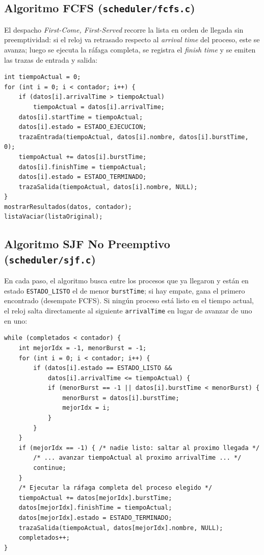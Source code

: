 \documentclass[12pt]{article}
\begin{document}
    \subsection{Algoritmo FCFS (\texttt{scheduler/fcfs.c})}
    El despacho \textit{First-Come, First-Served} recorre la lista en orden de llegada sin preemptividad: si el reloj va retrasado respecto al \textit{arrival time} del proceso, este se avanza; luego se ejecuta la ráfaga completa, se registra el \textit{finish time} y se emiten las trazas de entrada y salida:
    \begin{lstlisting}[caption={Nucleo del algoritmo FCFS no-preemptivo.}]
int tiempoActual = 0;
for (int i = 0; i < contador; i++) {
    if (datos[i].arrivalTime > tiempoActual)
        tiempoActual = datos[i].arrivalTime;
    datos[i].startTime = tiempoActual;
    datos[i].estado = ESTADO_EJECUCION;
    trazaEntrada(tiempoActual, datos[i].nombre, datos[i].burstTime, 0);
    tiempoActual += datos[i].burstTime;
    datos[i].finishTime = tiempoActual;
    datos[i].estado = ESTADO_TERMINADO;
    trazaSalida(tiempoActual, datos[i].nombre, NULL);
}
mostrarResultados(datos, contador);
listaVaciar(listaOriginal);
    \end{lstlisting}

    \subsection{Algoritmo SJF No Preemptivo (\texttt{scheduler/sjf.c})}
    En cada paso, el algoritmo busca entre los procesos que ya llegaron y están en estado \texttt{ESTADO\_LISTO} el de menor \texttt{burstTime}; si hay empate, gana el primero encontrado (desempate FCFS). Si ningún proceso está listo en el tiempo actual, el reloj salta directamente al siguiente \texttt{arrivalTime} en lugar de avanzar de uno en uno:
    \begin{lstlisting}[caption={Seleccion del proceso de menor ráfaga en SJF.}]
while (completados < contador) {
    int mejorIdx = -1, menorBurst = -1;
    for (int i = 0; i < contador; i++) {
        if (datos[i].estado == ESTADO_LISTO &&
            datos[i].arrivalTime <= tiempoActual) {
            if (menorBurst == -1 || datos[i].burstTime < menorBurst) {
                menorBurst = datos[i].burstTime;
                mejorIdx = i;
            }
        }
    }
    if (mejorIdx == -1) { /* nadie listo: saltar al proximo llegada */
        /* ... avanzar tiempoActual al proximo arrivalTime ... */
        continue;
    }
    /* Ejecutar la ráfaga completa del proceso elegido */
    tiempoActual += datos[mejorIdx].burstTime;
    datos[mejorIdx].finishTime = tiempoActual;
    datos[mejorIdx].estado = ESTADO_TERMINADO;
    trazaSalida(tiempoActual, datos[mejorIdx].nombre, NULL);
    completados++;
}
    \end{lstlisting}
\end{document}
